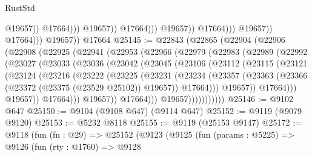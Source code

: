 \begin{lexlean}{RustStd}
\begin{coremodule}
                                                @19657))
                                            @17664)))
                                      @19657))
                                  @17664)))
                            @19657))
                        @17664)))
                  @19657))
              @17664)))
        @19657))
    @17664
@25145 := @22843
    (@22865
      (@22904
        (@22906
          (@22908
            (@22925
              (@22941
                (@22953
                  (@22966
                    (@22979
                      (@22983
                        (@22989
                          (@22992
                            (@23027
                              (@23033
                                (@23036
                                  (@23042
                                    (@23045
                                      (@23106
                                        (@23112
                                          (@23115
                                            (@23121
                                              (@23124
                                                (@23216
                                                  (@23222
                                                    (@23225
                                                      (@23231
                                                        (@23234
                                                          (@23357
                                                            (@23363
                                                              (@23366
                                                                (@23372
                                                                  (@23375 (@23529 @25102))
                                                                  @19657))
                                                              @17664)))
                                                        @19657))
                                                    @17664)))
                                              @19657))
                                          @17664)))
                                    @19657))
                                @17664)))
                          @19657)))))))))))
@25146 := @9102 @647
@25150 := @9104 (@9108 @647) (@9114 @647)
@25152 := @9119 (@9079 @9120)
@25153 := @5232 @8118
@25155 := @9119 (@25153 @9147)
@25172 := @9118
    (fun (fn : @29) =>
    @25152
      (@9123
        (@9125
          (fun (params : @5225) =>
          @9126
            (fun (rty : @1760) =>
            @9128

\end{coremodule}
\end{lexlean}
